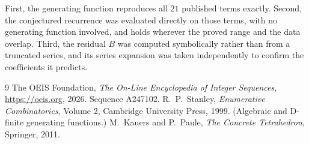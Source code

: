 \documentclass[11pt,a4paper]{article}
\theoremstyle{plain}
\theoremstyle{definition}
\begin{document}
First, the generating function reproduces all $21$ published terms exactly. Second,
the conjectured recurrence was evaluated directly on those terms, with no generating function
involved, and holds wherever the proved range and the data overlap. Third, the residual $B$ was
computed symbolically rather than from a truncated series, and its series expansion was taken
independently to confirm the coefficients it predicts.

\begin{thebibliography}{9}
 The OEIS Foundation, \emph{The On-Line Encyclopedia of Integer Sequences},
\url{https://oeis.org}, 2026. Sequence A247102.
 R.~P.~Stanley, \emph{Enumerative Combinatorics}, Volume 2, Cambridge
University Press, 1999. (Algebraic and D-finite generating functions.)
 M.~Kauers and P.~Paule, \emph{The Concrete Tetrahedron}, Springer, 2011.
\end{thebibliography}
\end{document}
